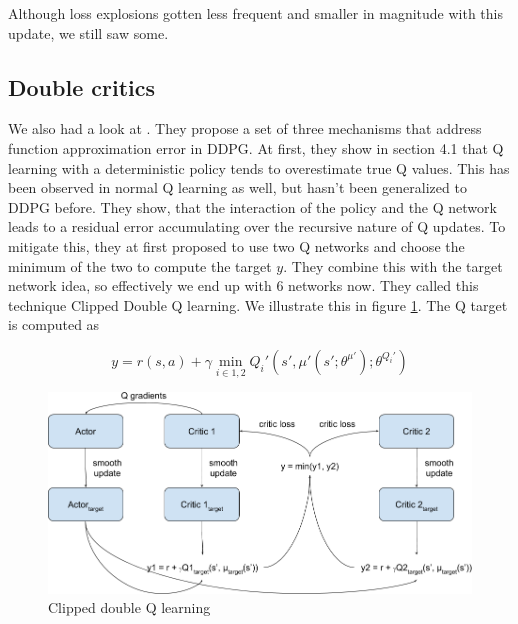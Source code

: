 \documentclass[hyperref,german,beleg]{cgvpub}
\begin{document}
Although loss explosions gotten less frequent and smaller in magnitude with this update, we still saw some.

\subsection{Double critics}



We also had a look at \cite{fujimotoAddressingFunctionApproximation2018}. They propose a set of three mechanisms that address function approximation error in \ac{DDPG}. At first, they show in section 4.1 that Q learning with a deterministic policy tends to overestimate true Q values. This has been observed in normal Q learning as well, but hasn't been generalized to \ac{DDPG} before. They show, that the interaction of the policy and the Q network leads to a residual error accumulating over the recursive nature of Q updates. To mitigate this, they at first proposed to use two Q networks and choose the minimum of the two to compute the target $y$. They combine this with the target network idea, so effectively we end up with 6 networks now. They called this technique Clipped Double Q learning. We illustrate this in figure \ref{fig:clippedq}. The Q target is computed as 

\begin{equation}
y = r(s, a) + \gamma \min_{i \in {1,2}} Q_i'(s', \mu'(s';\theta^{\mu'});\theta^{Q_i'})
\end{equation}

\begin{figure}
  \centering
  \includegraphics[width=\linewidth]{TD3-Setup.png}
  \caption{Clipped double Q learning}
  \label{fig:clippedq}
\end{figure}
\end{document}
